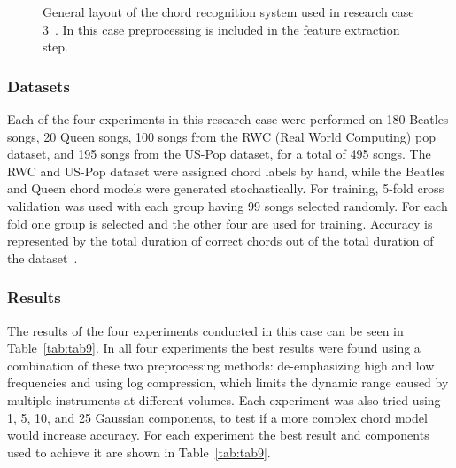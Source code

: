 \documentclass{sig-alternate}
\begin{document}


\begin{figure}[h]
\centering
{}
\caption{General layout of the chord recognition system used in research case 3~\cite{TaeMin:2014}. In this case preprocessing is included in the feature extraction step.}
\label{fig:fig3}
\end{figure}

\subsubsection{Datasets}

Each of the four experiments in this research case were performed on 180 Beatles songs, 20 Queen songs, 100 songs from the RWC (Real World Computing) pop dataset, and 195 songs from the US-Pop dataset, for a total of 495 songs. The RWC and US-Pop dataset were assigned chord labels by hand, while the Beatles and Queen chord models were generated stochastically. For training, 5-fold cross validation was used with each group having 99 songs selected randomly. For each fold one group is selected and the other four are used for training. Accuracy is represented by the total duration of correct chords out of the total duration of the dataset~\cite{TaeMin:2014}.

\subsubsection{Results}

The results of the four experiments conducted in this case can be seen in Table~\ref{tab:tab9}. In all four experiments the best results were found using a combination of these two preprocessing methods: de-emphasizing high and low frequencies and using log compression, which limits the dynamic range caused by multiple instruments at different volumes. Each experiment was also tried using 1, 5, 10, and 25 Gaussian components, to test if a more complex chord model would increase accuracy. For each experiment the best result and components used to achieve it are shown in Table~\ref{tab:tab9}. 
\end{document}
